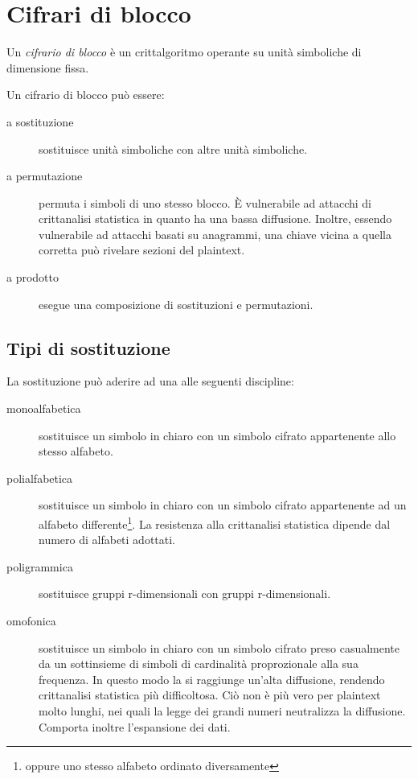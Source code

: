 \chapter{Cifrari di blocco}
\label{chp:block-ciphers}

Un \textit{cifrario di blocco} è un crittalgoritmo operante su unità simboliche di dimensione fissa.

Un cifrario di blocco può essere:
\begin{description}
  \item[a sostituzione] sostituisce unità simboliche con altre unità simboliche.
  \item[a permutazione] permuta i simboli di uno stesso blocco. È vulnerabile ad attacchi di crittanalisi statistica in quanto ha una bassa diffusione. Inoltre, essendo vulnerabile ad attacchi basati su anagrammi, una chiave vicina a quella corretta può rivelare sezioni del plaintext.
  \item[a prodotto] esegue una composizione di sostituzioni e permutazioni.
\end{description}

\section{Tipi di sostituzione}
La sostituzione può aderire ad una alle seguenti discipline:

\begin{description}
  \item[monoalfabetica] sostituisce un simbolo in chiaro con un simbolo cifrato appartenente allo stesso alfabeto.

  \item[polialfabetica] sostituisce un simbolo in chiaro con un simbolo cifrato appartenente ad un alfabeto differente\footnote{oppure uno stesso alfabeto ordinato diversamente}.   La resistenza alla crittanalisi statistica dipende dal numero di alfabeti adottati.

  \item[poligrammica] sostituisce gruppi r-dimensionali con gruppi r-dimensionali.

  \item[omofonica] sostituisce un simbolo in chiaro con un simbolo cifrato preso casualmente da un sottinsieme di simboli di cardinalità proprozionale alla sua frequenza. In questo modo la si raggiunge un'alta diffusione, rendendo crittanalisi statistica più difficoltosa. Ciò non è più vero per plaintext molto lunghi, nei quali la legge dei grandi numeri neutralizza la diffusione. Comporta inoltre l'espansione dei dati.
\end{description}


